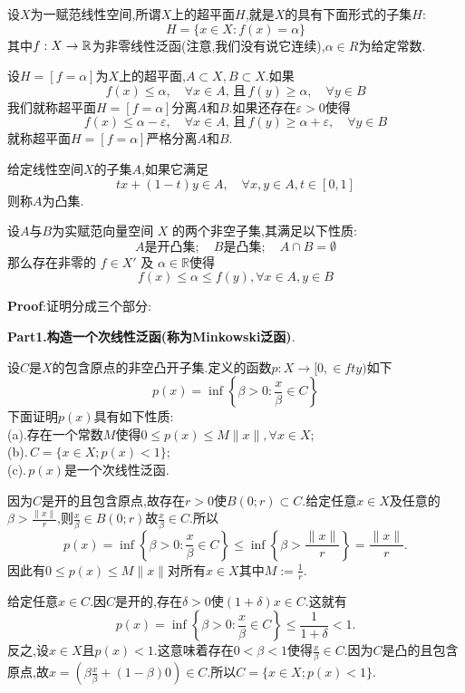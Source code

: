 \newpage
设$X$为一赋范线性空间,所谓$X$上的超平面$H$,就是$X$的具有下面形式的子集$H$:
$$
H=\{x\in X:f(x)=\alpha\}
$$
其中$f:X\to\mathbb{R}$为非零线性泛函(注意,我们没有说它连续),$\alpha\in R$为给定常数.\par
设$H=[f=\alpha]$为$X$上的超平面,$A\subset X,B\subset X$.如果
$$
f(x)\leqslant \alpha,\quad \forall x\in A,\,\text{且}\,f(y)\geqslant \alpha,\quad \forall y\in B
$$
我们就称超平面$H=[f=\alpha]$分离$A$和$B$.如果还存在$\varepsilon>0$使得
$$
f(x)\leqslant \alpha-\varepsilon,\quad \forall x\in A,\,\text{且}\,f(y)\geqslant \alpha+\varepsilon,\quad \forall y\in B
$$
就称超平面$H=[f=\alpha]$严格分离$A$和$B$.\par
给定线性空间$X$的子集$A$,如果它满足
$$
tx+(1-t)y\in A,\quad \forall x,y\in A,t\in [0,1]
$$
则称$A$为凸集.
\begin{tcolorbox}[colback=KuangNei,colframe=BianKuang,title=\textbf{Hahn-Banach定理的第一几何形式:凸集的分离},sharpish corners]
设$A$与$B$为实赋范向量空间 $X$ 的两个非空子集,其满足以下性质:
$$
A\text{是开凸集};\quad B\text{是凸集};\quad A\cap B=\emptyset
$$
那么存在非零的 $f \in X'$ 及 $\alpha\in\mathbb{R}$使得
$$
f(x)\leqslant \alpha\leqslant f(y),\forall x\in A,y\in B
$$
\end{tcolorbox}
\textbf{Proof}:证明分成三个部分:\par
\textbf{Part1.构造一个次线性泛函(称为Minkowski泛函)}.\par
设$C$是$X$的包含原点的非空凸开子集.定义的函数$p:X\to[0,\in fty)$如下
$$
p(x)=\inf\left\{\beta>0:{\frac{x}{\beta}}\in C\right\}
$$
下面证明$p(x)$具有如下性质:\\
(a).存在一个常数$M$使得$0\leqslant p(x)\leqslant M\|x\|,\forall x\in X$;\\
(b).\,$C=\{x\in X;p(x)<1\}$;\\
(c).\,$p(x)$是一个次线性泛函.\par
因为$C$是开的且包含原点,故存在$r>0$使$B(0;r)\subset C$.给定任意$x\in X$及任意的$\beta>{\frac{\|x\|}{r}}$,则$\frac{x}{\beta}\in B(0;r)$故$\frac{x}{\beta}\in C$.所以
$$
p(x)=\inf\left\{\beta>0:{\frac{x}{\beta}}\in C\right\}\leqslant \inf\left\{\beta>{\frac{\|x\|}{r}}\right\}={\frac{\|x\|}{r}}.
$$
因此有$0\leqslant p(x)\leqslant M\|x\|$对所有$x\in X$其中$M:={\frac{1}{r}}$.\par
给定任意$x\in C$.因$C$是开的,存在$\delta>0$使$(1+\delta)x\in C$.这就有
$$
p(x)=\inf\left\{\beta>0:{\frac{x}{\beta}}\in C\right\}\leqslant {\frac{1}{1+\delta}}<1.
$$
反之,设$x\in X$且$p(x)<1$.这意味着存在$0<\beta<1$使得$\frac{x}{\beta}\in C$.因为$C$是凸的且包含原点,故$x=\left(\beta\frac{x}{\beta}+(1-\beta)0\right)\in C$.所以$C=\{x\in X;p(x)<1\}$.\par
